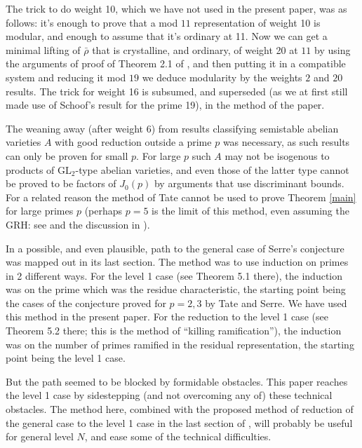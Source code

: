 \documentclass[12pt]{amsart}
\newcommand{\GL}{\mathrm{GL}}
\newcommand{\rhobar}{\overline{\rho}}
\def\rhobar{ {\bar {\rho} } }
\begin{document}
The trick to do weight 10, which we have not used in the
present paper, was as follows: it's enough to prove that a mod $11$ representation of weight 10 is modular, and enough to assume that it's ordinary at 11. Now we can get a minimal lifting of $\rhobar$ that is crystalline, and ordinary, of weight 20 at $11$ by using the arguments of proof of Theorem 2.1 of \cite{KW}, and then putting it in a compatible system and 
reducing it mod $19$ we deduce modularity by the weights $2$ and $20$ results.
The trick for weight 16 is subsumed, and superseded (as we at first still made
use of Schoof's result for the prime 19), in the 
method of the paper. 

The weaning away (after weight 6) 
from results classifying semistable abelian varieties 
$A$ with good reduction outside a prime $p$ was necessary, as such results can only be proven for small $p$. For large $p$ such $A$ may not be isogenous to products of $\GL_2$-type abelian varieties, and even those of the latter type cannot be proved to be factors of $J_0(p)$  by arguments that use discriminant bounds. For a related reason the method of Tate cannot be used
to prove Theorem \ref{main} for large primes $p$ (perhaps $p=5$ is the limit
of this method, even assuming the GRH: see \cite{Tate} and the discussion in \cite{Brue}).

In \cite{KW} a possible, and even plausible, path to the general case of Serre's conjecture was mapped out
in its last section. The method was to use induction on primes in 2 different ways. For the level 1 case (see Theorem 5.1 there), the induction was on the prime which was the residue characteristic, the starting point being the cases of the conjecture proved for $p=2,3$ by Tate and Serre. 
We have used this method in the present paper.
For the reduction to the level 1 case (see Theorem 5.2 there; this is the method of ``killing ramification''),
the induction was on the number of primes ramified in the residual representation, the starting point being the level 1 case.  

But the path seemed to be blocked by 
formidable obstacles. This paper reaches 
the level 1 case by sidestepping (and not overcoming any of) these technical obstacles. The method here, combined 
with the proposed method of reduction of the general case 
to the level 1 case in the last section of \cite{KW}, will probably be useful for general
level $N$, and ease some of the technical difficulties. 

\end{document}
